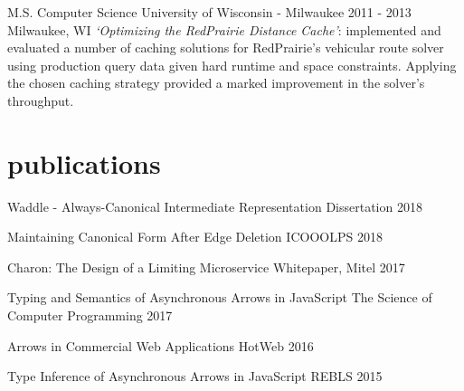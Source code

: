 \documentclass[]{clean-resume}
\begin{document}
\entry
  {M.S. Computer Science}
  {University of Wisconsin - Milwaukee}
  {2011 - 2013}
  {Milwaukee, WI}
  {
    \emph{`Optimizing the RedPrairie Distance Cache'}: implemented and evaluated a number of caching solutions for RedPrairie's vehicular route solver using production query data given hard runtime and space constraints. Applying the chosen caching strategy provided a marked improvement in the solver's throughput.
  }

\section{publications}

\shortentry
  {Waddle - Always-Canonical Intermediate Representation}
  {Dissertation}
  {2018}
  
\shortentry
  {Maintaining Canonical Form After Edge Deletion}
  {ICOOOLPS}
  {2018}

\shortentry
  {Charon: The Design of a Limiting Microservice}
  {Whitepaper, Mitel}
  {2017}

\shortentry
  {Typing and Semantics of Asynchronous Arrows in JavaScript}
  {The Science of Computer Programming}
  {2017}
  
\shortentry
  {Arrows in Commercial Web Applications}
  {HotWeb}
  {2016}
  
\shortentry
  {Type Inference of Asynchronous Arrows in JavaScript}
  {REBLS}
  {2015}
\end{document}
